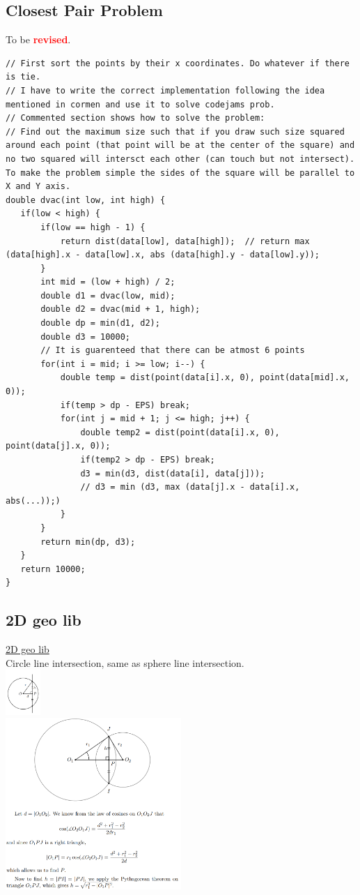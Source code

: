 \documentclass[8pt, a4paper, oneside, twocolumn]{extarticle}
\newcommand{\revised}{To be \textcolor{red}{\textbf{revised}}.}
\begin{document}
\subsection{Closest Pair Problem}
\revised
\begin{verbatim}
// First sort the points by their x coordinates. Do whatever if there is tie.
// I have to write the correct implementation following the idea mentioned in cormen and use it to solve codejams prob.
// Commented section shows how to solve the problem: 
// Find out the maximum size such that if you draw such size squared around each point (that point will be at the center of the square) and no two squared will intersct each other (can touch but not intersect). To make the problem simple the sides of the square will be parallel to X and Y axis.
double dvac(int low, int high) {
   if(low < high) {
       if(low == high - 1) {
           return dist(data[low], data[high]);  // return max (data[high].x - data[low].x, abs (data[high].y - data[low].y));  
       }
       int mid = (low + high) / 2;
       double d1 = dvac(low, mid);
       double d2 = dvac(mid + 1, high);
       double dp = min(d1, d2);
       double d3 = 10000;
       // It is guarenteed that there can be atmost 6 points
       for(int i = mid; i >= low; i--) {
           double temp = dist(point(data[i].x, 0), point(data[mid].x, 0));
           if(temp > dp - EPS) break;
           for(int j = mid + 1; j <= high; j++) {
               double temp2 = dist(point(data[i].x, 0), point(data[j].x, 0));
               if(temp2 > dp - EPS) break;
               d3 = min(d3, dist(data[i], data[j]));
               // d3 = min (d3, max (data[j].x - data[i].x, abs(...));)
           }
       }
       return min(dp, d3);
   }
   return 10000;
}

\end{verbatim}
\subsection{2D geo lib}
\href{https://github.com/sourabhxyz/Competitive-Programming/blob/master/Libs/2dgeoLib.cpp}{2D geo lib}
\\Circle line intersection, same as sphere line intersection.\\
\includegraphics[width=0.1\textwidth,height=0.1\textheight,keepaspectratio]{assets/circleline}
\\\includegraphics[width=0.5\textwidth,height=0.5\textheight,keepaspectratio]{assets/circlecircle}
\end{document}
